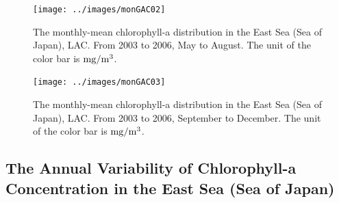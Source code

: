 \begin{figure}[p]
	\centering
	\texttt{[image: ../images/monGAC02]}\\
	\caption{The monthly-mean chlorophyll-a distribution in the East Sea (Sea of Japan), LAC. From 2003 to 2006, May to August. The unit of the color bar is $\rm mg/m^3$.}
	\label{fig:monGAC02}
\end{figure}


\begin{figure}[p]
	\centering
	\texttt{[image: ../images/monGAC03]}\\
	\caption{The monthly-mean chlorophyll-a distribution in the East Sea (Sea of Japan), LAC. From 2003 to 2006, September to December. The unit of the color bar is $\rm mg/m^3$.}
	\label{fig:monGAC03}
\end{figure}


\newpage
 
\subsection{The Annual Variability of Chlorophyll-a Concentration in the East Sea (Sea of Japan)}
 



